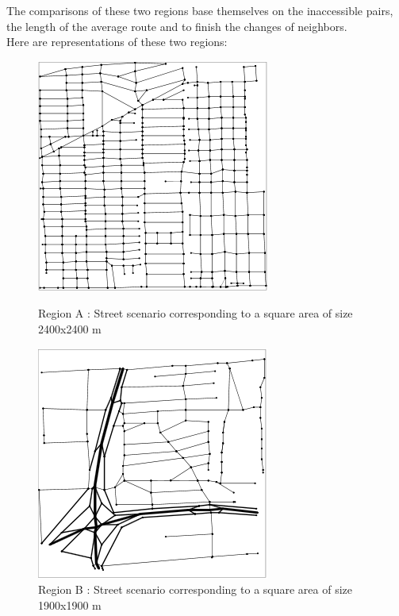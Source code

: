 The comparisons of these two regions base themselves on the inaccessible pairs, the length of the average route and to finish the changes of neighbors.\\

Here are representations of these two regions:\\

\begin{figure}[h!]
    \begin{minipage}[b]{0.4\linewidth}
        \centering \includegraphics[scale=1]{../images/cityA.png}
        \caption{Region A : Street scenario corresponding to a square area of size 2400x2400 m\cite{VehicularAdHocNetworks9}}
    \end{minipage}\hfill
    \begin{minipage}[b]{0.48\linewidth}
        \centering \includegraphics[scale=1]{../images/cityB.png}
        \caption{Region B : Street scenario corresponding to a square area of size 1900x1900 m\cite{VehicularAdHocNetworks9}}
    \end{minipage}
\end{figure}

